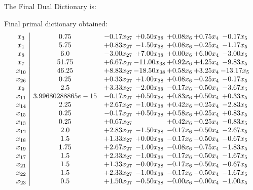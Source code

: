 \documentclass[8pt]{article}
\begin{document}
The Final Dual Dictionary is: 

 Final primal dictionary obtained: 
\[\begin{array}{c| c c@{\hskip 2pt} c@{\hskip 2pt} c@{\hskip 2pt} c@{\hskip 2pt} c@{\hskip 2pt} }
 x_{3}   &  0.75 & -0.17 x_{27} & +  0.50 x_{38} & +  0.08 x_{6} & +  0.75 x_{4} & -0.17 x_{5}\\
 x_{1}   &  5.75 & +  0.83 x_{27} & -1.50 x_{38} & +  0.08 x_{6} & -0.25 x_{4} & -1.17 x_{5}\\
 x_{8}   &  6.0 & -3.00 x_{27} & +  7.00 x_{38} & +  0.00 x_{6} & +  6.00 x_{4} & -3.00 x_{5}\\
 x_{7}   &  51.75 & +  6.67 x_{27} & -11.00 x_{38} & +  0.92 x_{6} & +  4.25 x_{4} & -9.83 x_{5}\\
 x_{10}   &  46.25 & +  8.83 x_{27} & -18.50 x_{38} & +  0.58 x_{6} & +  3.25 x_{4} & -13.17 x_{5}\\
 x_{26}   &  0.25 & +  0.33 x_{27} & +  1.00 x_{38} & +  0.08 x_{6} & -0.25 x_{4} & -0.17 x_{5}\\
 x_{9}   &  2.5 & +  3.33 x_{27} & -2.00 x_{38} & -0.17 x_{6} & -0.50 x_{4} & -3.67 x_{5}\\
 x_{11}   &  3.99680288865e-15 & -0.17 x_{27} & +  0.50 x_{38} & +  0.83 x_{6} & +  0.50 x_{4} & +  0.33 x_{5}\\
 x_{14}   &  2.25 & +  2.67 x_{27} & -1.00 x_{38} & +  0.42 x_{6} & -0.25 x_{4} & -2.83 x_{5}\\
 x_{15}   &  0.25 & -0.17 x_{27} & +  0.50 x_{38} & +  0.58 x_{6} & +  0.25 x_{4} & +  0.83 x_{5}\\
 x_{13}   &  0.25 & +  0.67 x_{27} &   & +  0.42 x_{6} & -0.25 x_{4} & -0.83 x_{5}\\
 x_{12}   &  2.0 & +  2.83 x_{27} & -1.50 x_{38} & -0.17 x_{6} & -0.50 x_{4} & -2.67 x_{5}\\
 x_{18}   &  1.5 & +  1.33 x_{27} & +  0.00 x_{38} & -0.17 x_{6} & -0.50 x_{4} & -0.67 x_{5}\\
 x_{19}   &  1.75 & +  2.67 x_{27} & -1.00 x_{38} & -0.08 x_{6} & -0.75 x_{4} & -1.83 x_{5}\\
 x_{17}   &  1.5 & +  2.33 x_{27} & -1.00 x_{38} & -0.17 x_{6} & -0.50 x_{4} & -1.67 x_{5}\\
 x_{21}   &  1.5 & +  1.33 x_{27} & -0.00 x_{38} & -0.17 x_{6} & -0.50 x_{4} & -0.67 x_{5}\\
 x_{22}   &  1.5 & +  2.33 x_{27} & -1.00 x_{38} & -0.17 x_{6} & -0.50 x_{4} & -1.67 x_{5}\\
 x_{23}   &  0.5 & +  1.50 x_{27} & -0.50 x_{38} & -0.00 x_{6} & -0.00 x_{4} & -1.00 x_{5}\\

\end{array}\]
\end{document}
